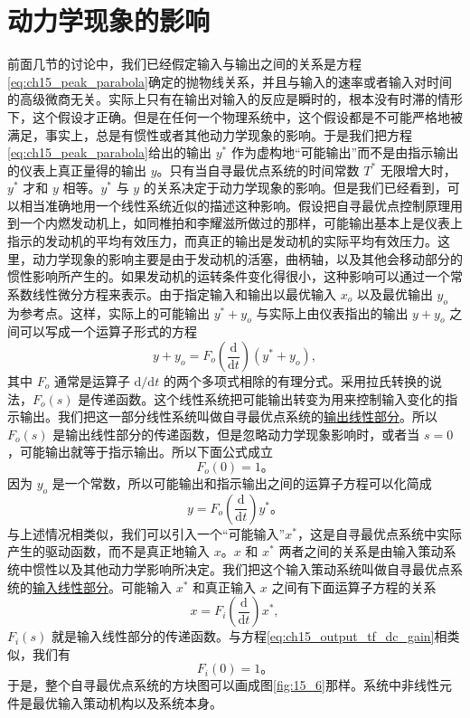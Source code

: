 \section{动力学现象的影响}

前面几节的讨论中，我们已经假定输入与输出之间的关系是方程\eqref{eq:ch15_peak_parabola}确定的抛物线关系，并且与输入的速率或者输入对时间的高级微商无关。实际上只有在输出对输入的反应是瞬时的，根本没有时滞的情形下，这个假设才正确。但是在任何一个物理系统中，这个假设都是不可能严格地被满足，事实上，总是有惯性或者其他动力学现象的影响。于是我们把方程\eqref{eq:ch15_peak_parabola}给出的输出 $y^*$ 作为虚构地“可能输出”而不是由指示输出的仪表上真正量得的输出 $y$。只有当自寻最优点系统的时间常数 $T^*$ 无限增大时，$y^*$ 才和 $y$ 相等。$y^*$ 与 $y$ 的关系决定于动力学现象的影响。但是我们已经看到，可以相当准确地用一个线性系统近似的描述这种影响。假设把自寻最优点控制原理用到一个内燃发动机上，如同椎拍和李耀滋所做过的那样，可能输出基本上是仪表上指示的发动机的平均有效压力，而真正的输出是发动机的实际平均有效压力。这里，动力学现象的影响主要是由于发动机的活塞，曲柄轴，以及其他会移动部分的惯性影响所产生的。如果发动机的运转条件变化得很小，这种影响可以通过一个常系数线性微分方程来表示。由于指定输入和输出以最优输入 $x_o$ 以及最优输出 $y_o$ 为参考点。这样，实际上的可能输出 $y^*+y_o$ 与实际上由仪表指出的输出 $y+y_o$ 之间可以写成一个运算子形式的方程
\begin{equation*}
y+y_o = F_o\left(\frac{\mathrm{d}}{\mathrm{d}t}\right)(y^*+y_o),
\end{equation*}
其中 $F_o$ 通常是运算子 $\mathrm{d}/\mathrm{d}t$ 的两个多项式相除的有理分式。采用拉氏转换的说法，$F_o(s)$ 是传递函数。这个线性系统把可能输出转变为用来控制输入变化的指示输出。我们把这一部分线性系统叫做自寻最优点系统的\underline{输出线性部分}。所以 $F_o(s)$ 是输出线性部分的传递函数，但是忽略动力学现象影响时，或者当 $s=0$，可能输出就等于指示输出。所以下面公式成立
\begin{equation}
F_o(0) = 1。
\label{eq:ch15_output_tf_dc_gain}
\end{equation}
因为 $y_o$ 是一个常数，所以可能输出和指示输出之间的运算子方程可以化简成
\begin{equation}
y = F_o\left(\frac{\mathrm{d}}{\mathrm{d}t}\right)y^*。
\label{eq:ch15_output_relation}
\end{equation}
与上述情况相类似，我们可以引入一个“可能输入”$x^*$，这是自寻最优点系统中实际产生的驱动函数，而不是真正地输入 $x$。$x$ 和 $x^*$ 两者之间的关系是由输入策动系统中惯性以及其他动力学影响所决定。我们把这个输入策动系统叫做自寻最优点系统的\underline{输入线性部分}。可能输入 $x^*$ 和真正输入 $x$ 之间有下面运算子方程的关系
\begin{equation}
x = F_i\left(\frac{\mathrm{d}}{\mathrm{d}t}\right)x^*,
\label{eq:ch15_input_relation}
\end{equation}
$F_i(s)$ 就是输入线性部分的传递函数。与方程\eqref{eq:ch15_output_tf_dc_gain}相类似，我们有
\begin{equation}
F_i(0) = 1。
\label{eq:ch15_input_tf_dc_gain}
\end{equation}
于是，整个自寻最优点系统的方块图可以画成图\ref{fig:15_6}那样。系统中非线性元件是最优输入策动机构以及系统本身。

